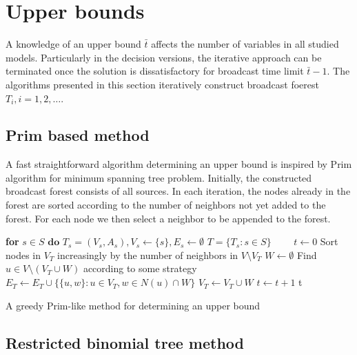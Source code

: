 \section{Upper bounds}

A knowledge of an upper bound $\bar{t}$ affects the number of variables in all studied models. 
Particularly in the decision versions, the iterative approach can be terminated once the solution is dissatisfactory for broadcast time limit $\bar{t}-1$.
The algorithms presented in this section iteratively construct broadcast foerest $T_i, i=1,2,\dots$.
\subsection{Prim based method}

A fast straightforward algorithm determining an upper bound is inspired by Prim algorithm for minimum spanning tree problem.
Initially, the constructed broadcast forest consists of all sources. 
In each iteration, the nodes already in the forest are sorted according to the number of neighbors not yet added to the forest.
For each node we then select a neighbor to be appended to the forest.
\begin{algorithm}[]
\textbf{for }$s\in S\textbf{ do }T_s=(V_s,A_s), V_s\leftarrow \{s\}, E_s\leftarrow\emptyset$\;
$T=\{T_s:s\in S\}$\ ~~~
$t\leftarrow 0$\;
 {
	Sort nodes in $V_T$ increasingly by the number of neighbors in $V\setminus V_T$\;
	$W\leftarrow\emptyset$\;
	 {
		Find $u\in V\setminus (V_T\cup W)$ according to some strategy\; 	
	}
	$E_T\leftarrow E_T\cup \{\{u,w\}: u\in V_T, w\in N(u)\cap W\}$\;
	$V_T\leftarrow V_T\cup W$\;
	$t\leftarrow t+1$\;
}
\Return t\;
 \caption{A greedy Prim-like method for determining an upper bound}
\label{alg:primlike}
\end{algorithm}

\subsection{Restricted binomial tree method}

